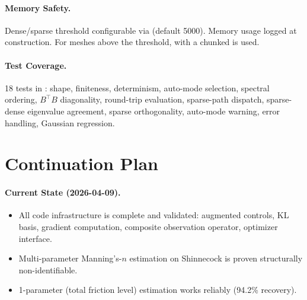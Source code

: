 \documentclass[11pt]{article}
\begin{document}
\paragraph{Memory Safety.}
Dense/sparse threshold configurable via  (default 5000). Memory usage logged at construction. For meshes above the threshold,  with a chunked  is used.

\paragraph{Test Coverage.}
18 tests in : shape, finiteness, determinism, auto-mode selection, spectral ordering, $B^\top B$ diagonality, round-trip evaluation, sparse-path dispatch, sparse-dense eigenvalue agreement, sparse orthogonality, auto-mode warning, error handling, Gaussian regression.

\section{Continuation Plan}
\paragraph{Current State (2026-04-09).}
\begin{itemize}
\item All code infrastructure is complete and validated: augmented controls, KL basis, gradient computation, composite observation operator, optimizer interface.
\item Multi-parameter Manning's-$n$ estimation on Shinnecock is proven structurally non-identifiable.
\item 1-parameter (total friction level) estimation works reliably (94.2\% recovery).
\end{itemize}
\end{document}
